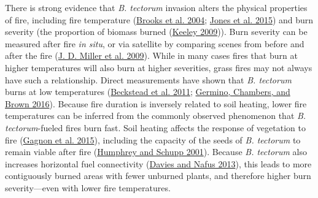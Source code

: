 \documentclass[
  12pt,
]{article}
\begin{document}
There is strong evidence that \emph{B. tectorum} invasion alters the
physical properties of fire, including fire temperature
(\protect\hyperlink{ref-Brooks2004}{Brooks et al. 2004};
\protect\hyperlink{ref-Jones2015}{Jones et al. 2015}) and burn severity
(the proportion of biomass burned
(\protect\hyperlink{ref-Keeley2009}{Keeley 2009})). Burn severity can be
measured after fire \emph{in situ}, or via satellite by comparing scenes
from before and after the fire (\protect\hyperlink{ref-Miller2009}{J. D.
Miller et al. 2009}). While in many cases fires that burn at higher
temperatures will also burn at higher severities, grass fires may not
always have such a relationship. Direct measurements have shown that
\emph{B. tectorum} burns at low temperatures
(\protect\hyperlink{ref-Beckstead2011}{Beckstead et al. 2011};
\protect\hyperlink{ref-Germino2016}{Germino, Chambers, and Brown 2016}).
Because fire duration is inversely related to soil heating, lower fire
temperatures can be inferred from the commonly observed phenomenon that
\emph{B. tectorum}-fueled fires burn fast. Soil heating affects the
response of vegetation to fire
(\protect\hyperlink{ref-Gagnon2015}{Gagnon et al. 2015}), including the
capacity of the seeds of \emph{B. tectorum} to remain viable after fire
(\protect\hyperlink{ref-Humphrey2001}{Humphrey and Schupp 2001}).
Because \emph{B. tectorum} also increases horizontal fuel connectivity
(\protect\hyperlink{ref-Davies2013}{Davies and Nafus 2013}), this leads
to more contiguously burned areas with fewer unburned plants, and
therefore higher burn severity---even with lower fire temperatures.
\end{document}
